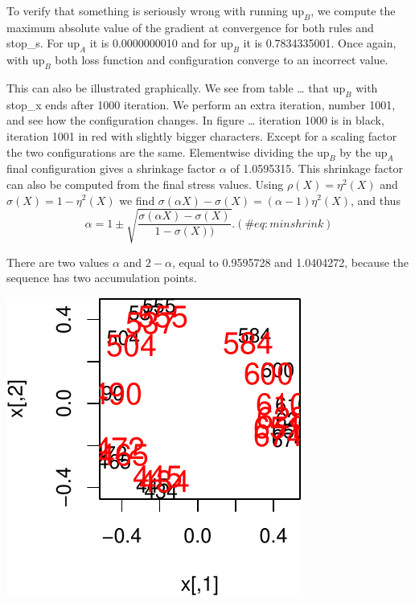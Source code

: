 \documentclass[
  12pt,
  letterpaper,
  DIV=11,
  numbers=noendperiod]{scrreprt}
\theoremstyle{remark}
\begin{document}
To verify that something is seriously wrong with running
\(\text{up}_B\), we compute the maximum absolute value of the gradient
at convergence for both rules and stop\_s. For \(\text{up}_A\) it is
0.0000000010 and for \(\text{up}_B\) it is 0.7834335001. Once again,
with \(\text{up}_B\) both loss function and configuration converge to an
incorrect value.

This can also be illustrated graphically. We see from table \ldots{}
that \(\text{up}_B\) with stop\_x ends after 1000 iteration. We perform
an extra iteration, number 1001, and see how the configuration changes.
In figure \ldots{} iteration 1000 is in black, iteration 1001 in red
with slightly bigger characters. Except for a scaling factor the two
configurations are the same. Elementwise dividing the \(\text{up}_B\) by
the \(\text{up}_A\) final configuration gives a shrinkage factor
\(\alpha\) of 1.0595315. This shrinkage factor can also be computed from
the final stress values. Using \(\rho(X)=\eta^2(X)\) and
\(\sigma(X)=1-\eta^2(X)\) we find
\(\sigma(\alpha X)-\sigma(X)=(\alpha-1)\eta^2(X)\), and thus
\begin{equation}
\alpha=1\pm\sqrt{\frac{\sigma(\alpha X)-\sigma(X)}{1-\sigma(X))}}.
(\#eq:minshrink)
\end{equation}

There are two values \(\alpha\) and \(2-\alpha\), equal to 0.9595728 and
1.0404272, because the sequence has two accumulation points.

\includegraphics{acceleration_files/figure-pdf/unnamed-chunk-4-1.pdf}
\end{document}
